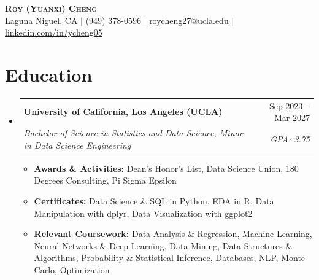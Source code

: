 \documentclass[letterpaper,11pt]{article}
\makeatletter
\newcommand{\resumeItem}[1]{
  \item\small{#1}
}
\newcommand{\resumeSubheading}[4]{
  \vspace{-2pt}\item
    \begin{tabular*}{\textwidth}[t]{l@{\extracolsep{\fill}}r}
      \textbf{#1} & #2 \\
      \textit{\small#3} & \textit{\small #4} \\
    \end{tabular*}\vspace{-7pt}
}
\newcommand{\resumeSubHeadingListStart}{\begin{itemize}[leftmargin=0in, label={}]}
\newcommand{\resumeSubHeadingListEnd}{\end{itemize}}
\newcommand{\resumeItemListStart}{\begin{itemize}[itemsep= 1.5pt, parsep=0pt]}
\newcommand{\resumeItemListEnd}{\end{itemize}\vspace{-5pt}}
\makeatother
\begin{document}
\begin{center}
    \textbf{\LARGE \scshape Roy (Yuanxi) Cheng} \\ \vspace{3pt}
    \small Laguna Niguel, CA $|$ (949) 378-0596 $|$
    \href{mailto:roycheng27@ucla.edu}{\underline{roycheng27@ucla.edu}} $|$
    \href{https://www.linkedin.com/in/ycheng05}{\underline{linkedin.com/in/ycheng05}}
\end{center}
\section{Education}
  \resumeSubHeadingListStart
    \resumeSubheading
      {University of California, Los Angeles (UCLA)}{Sep 2023 -- Mar 2027}
      {Bachelor of Science in Statistics and Data Science, Minor in Data Science Engineering}{GPA: 3.75}
      \resumeItemListStart
        \resumeItem{\textbf{Awards \& Activities:} Dean's Honor's List, Data Science Union, 180 Degrees Consulting, Pi Sigma Epsilon}
        \resumeItem{\textbf{Certificates:} Data Science \& SQL in Python, EDA in R, Data Manipulation with dplyr, Data Visualization with ggplot2}
        \resumeItem{\textbf{Relevant Coursework:} Data Analysis \& Regression, Machine Learning, Neural Networks \& Deep Learning, Data Mining, Data Structures \& Algorithms, Probability \& Statistical Inference, Databases, NLP, Monte Carlo, Optimization}
      \resumeItemListEnd
  \resumeSubHeadingListEnd
\end{document}
